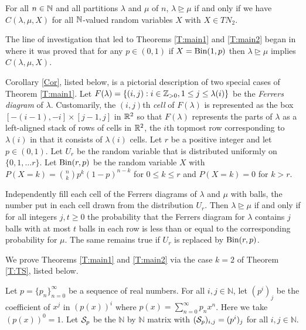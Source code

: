 \documentclass[12pt]{article}
\begin{document}
\begin{theorem} \label{T:main2}  For all $n \in \mathbb{N}$ and all partitions $\lambda$ and $\mu$ of $n$, $\lambda \trianglerighteq \mu$ if and only if we have $C(\lambda,\mu,X)$ for all $\mathbb{N}$-valued random variables $X$ with $X \in TN_2$.
\end{theorem}

The line of investigation that led to Theorems \ref{T:main1} and \ref{T:main2} began in \cite{Mahlburg:2013aa} where it was proved that for any $p \in (0,1)$ if $X = \text{Bin}(1,p)$ then $\lambda \trianglerighteq \mu$ implies $C(\lambda,\mu,X)$.

Corollary \ref{Cor}, listed below, is a pictorial description of two special cases of Theorem \ref{T:main1}.  Let $F(\lambda) = \{(i,j): i \in \mathbb{Z}_{>0}, 1 \leq j \leq \lambda(i)\}$ be the \emph{Ferrers diagram} of $\lambda$.  Customarily, the $(i,j)$th \emph{cell} of $F(\lambda)$ is represented as the box $[-(i-1),-i] \times [j-1,j]$ in $\mathbb{R}^2$ so that $F(\lambda)$ represents the parts of $\lambda$ as a left-aligned stack of rows of cells in $\mathbb{R}^2$, the $i$th topmost row corresponding to $\lambda(i)$ in that it consists of $\lambda(i)$ cells. Let $r$ be a positive integer and let $p \in (0,1)$.  Let $U_r$ be the random variable that is distributed uniformly on $\{0,1,\ldots r\}$.  Let $\text{Bin}(r,p)$ be the random variable $X$ with $P(X=k) = \binom{n}{k} p^k(1-p)^{n-k}$ for $0 \leq k \leq r$ and $P(X=k) = 0$ for $k > r$.

\begin{corollary} \label{Cor}
Independently fill each cell of the Ferrers diagrams of $\lambda$ and $\mu$ with balls, the number put in each cell drawn from the distribution $U_r$. Then $\lambda \trianglerighteq \mu$ if and only if for all integers $j,t \geq 0$ the probability that the Ferrers diagram for $\lambda$ contains $j$ balls with at most $t$ balls in each row is less than or equal to the corresponding probability for $\mu$.  The same remains true if $U_r$ is replaced by $\text{Bin}(r,p)$.

\end{corollary}

We prove Theorems \ref{T:main1} and \ref{T:main2} via the case $k=2$ of Theorem \ref{T:TS}, listed below.

Let $p = \{p_n\}_{n=0}^\infty$ be a sequence of real numbers. For all $i,j \in \mathbb{N}$, let $(p^i)_j$ be the coefficient of $x^j$ in $(p(x))^i$ where $p(x) = \sum_{n=0}^\infty p_n x^n$. Here we take $(p(x))^0 = 1$. Let ${\cal S}_p$ be the $\mathbb{N}$ by $\mathbb{N}$ matrix with $({\cal S}_p)_{i,j} = (p^i)_j$ for all $i, j \in \mathbb{N}$. 
\end{document}
